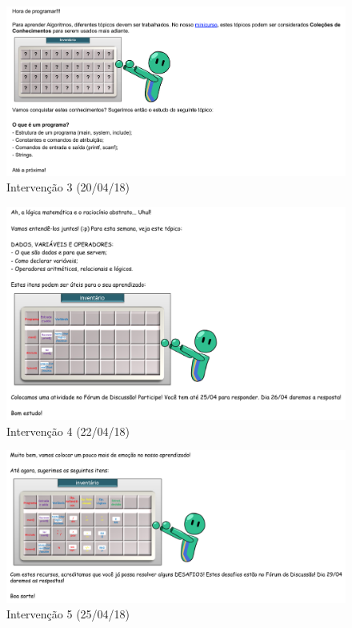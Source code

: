 \begin{figure}[htb]
  \caption{\label{fig:intervencao-3}Intervenção 3 (20/04/18)}
  \begin{center}
      \includegraphics[scale=0.6]{./Figuras/intervencao-3.png}
  \end{center}
\end{figure}

\begin{figure}[htb]
  \caption{\label{fig:intervencao-4}Intervenção 4 (22/04/18)}
  \begin{center}
      \includegraphics[scale=0.6]{./Figuras/intervencao-4.png}
  \end{center}
\end{figure}

\begin{figure}[htb]
  \caption{\label{fig:intervencao-5}Intervenção 5 (25/04/18)}
  \begin{center}
      \includegraphics[scale=0.6]{./Figuras/intervencao-5.png}
  \end{center}
\end{figure}

